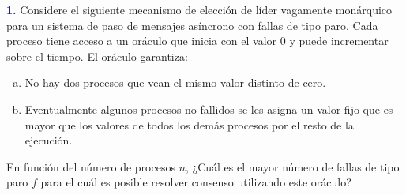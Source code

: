 \newpage\textbf{\textcolor{MidnightBlue}{1.}}
Considere el siguiente mecanismo de elección de líder vagamente monárquico para
un sistema de paso de mensajes asíncrono con fallas de tipo paro. Cada proceso tiene
acceso a un oráculo que inicia con el valor $0$ y puede incrementar sobre el tiempo.
El oráculo garantiza:
\begin{enumerate}[a)]
\item No hay dos procesos que vean el mismo valor distinto de cero.
\item Eventualmente algunos procesos no fallidos se les asigna un valor fijo que es
mayor que los valores de todos los demás procesos por el resto de la ejecución.
\end{enumerate}

En función del número de procesos $n$, ¿Cuál es el mayor número de fallas de tipo
paro
$f$ para el cuál es posible resolver consenso utilizando este oráculo?\\
